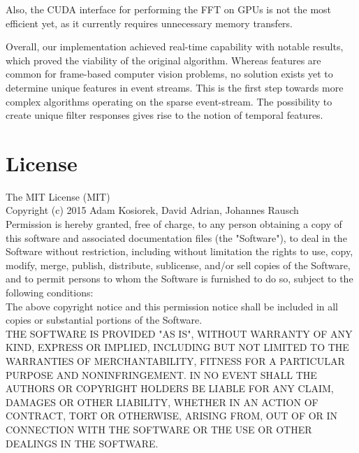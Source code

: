 \documentclass[a4paper,twoside, openright,12pt]{report}
\begin{document}
Also, the CUDA interface for performing the FFT on GPUs is not the most efficient yet, as it currently requires unnecessary memory transfers.

Overall, our implementation achieved real-time capability with notable results, which proved the viability of the original algorithm.
Whereas features are common for frame-based computer vision problems, no solution exists yet to determine unique features in event streams.
This is the first step towards more complex algorithms operating on the sparse event-stream.
The possibility to create unique filter responses gives rise to the notion of temporal features.







\cleardoublepage
{}
\listoffigures 	 %


\cleardoublepage
{}




\cleardoublepage
\chapter*{License}
The MIT License (MIT)\\

Copyright (c) 2015 Adam Kosiorek, David Adrian, Johannes Rausch\\

Permission is hereby granted, free of charge, to any person obtaining a copy of this software and associated documentation files (the "Software"), to deal in the Software without restriction, including without limitation the rights to use, copy, modify, merge, publish, distribute, sublicense, and/or sell copies of the Software, and to permit persons to whom the Software is furnished to do so, subject to the following conditions:\\

The above copyright notice and this permission notice shall be included in all copies or substantial portions of the Software.\\

THE SOFTWARE IS PROVIDED "AS IS", WITHOUT WARRANTY OF ANY KIND, EXPRESS OR IMPLIED, INCLUDING BUT NOT LIMITED TO THE WARRANTIES OF MERCHANTABILITY, FITNESS FOR A PARTICULAR PURPOSE AND NONINFRINGEMENT. IN NO EVENT SHALL THE AUTHORS OR COPYRIGHT HOLDERS BE LIABLE FOR ANY CLAIM, DAMAGES OR OTHER LIABILITY, WHETHER IN AN ACTION OF CONTRACT, TORT OR OTHERWISE, ARISING FROM, OUT OF OR IN CONNECTION WITH THE SOFTWARE OR THE USE OR OTHER DEALINGS IN THE SOFTWARE.
\end{document}

